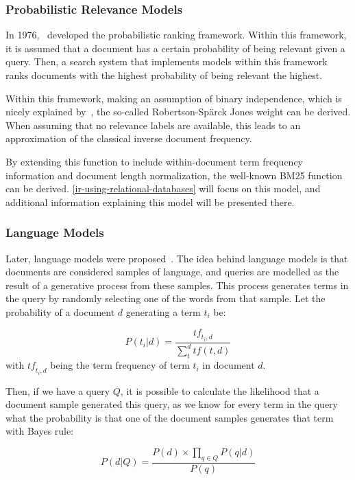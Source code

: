 \subsubsection{Probabilistic Relevance Models}
\label{sec:probabilistic-relevance-models}
In 1976,~\citeauthor{RSJ} developed the probabilistic ranking framework. Within this framework, it is assumed that a document has a certain probability of being relevant given a query. Then, a search system that implements models within this framework ranks documents with the highest probability of being relevant the highest.

Within this framework, making an assumption of binary independence, which is nicely explained by~\citet{bm25-beyond}, the so-called Robertson-Sp{\"a}rck Jones weight can be derived. When assuming that no relevance labels are available, this leads to an approximation of the classical inverse document frequency.

By extending this function to include within-document term frequency information and document length normalization, the well-known BM25 function can be derived. \cref{ir-using-relational-databases} will focus on this model, and additional information explaining this model will be presented there.

\subsubsection{Language Models}
Later, language models were proposed~\citep{croft_lm, hiemstra_lm, zhai_lm}. The idea behind language models is that documents are considered samples of language, and queries are modelled as the result of a generative process from these samples. This process generates terms in the query by randomly selecting one of the words from that sample. Let the probability of a document $d$ generating a term $t_i$ be:

\begin{equation}
	P(t_i|d) = \frac{\mathit{tf}_{t_i,d}}{\sum_t^d tf(t, d)}
\end{equation}
with $\mathit{tf}_{t_i, d}$ being the term frequency of term $t_i$ in document $d$. 

Then, if we have a query $Q$, it is possible to calculate the likelihood that a document sample generated this query, as we know for every term in the query what the probability is that one of the document samples generates that term with Bayes rule: 

\begin{equation}
	P(d|Q) = \frac{P(d) \times \prod_{q \in Q} P(q | d)}{P(q)}
\end{equation}


